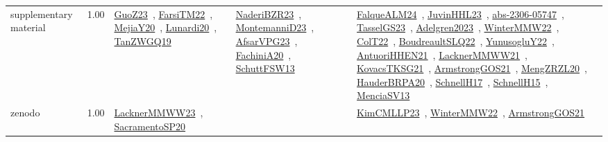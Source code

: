 {\begin{longtable}{p{3cm}r>{\raggedright\arraybackslash}p{6cm}>{\raggedright\arraybackslash}p{6cm}>{\raggedright\arraybackslash}p{8cm}}
\index{supplementary material}\index{Benchmarks!supplementary material}supplementary material &  1.00 & \href{../works/GuoZ23.pdf}{GuoZ23}~\cite{GuoZ23}, \href{../works/FarsiTM22.pdf}{FarsiTM22}~\cite{FarsiTM22}, \href{../works/MejiaY20.pdf}{MejiaY20}~\cite{MejiaY20}, \href{../works/Lunardi20.pdf}{Lunardi20}~\cite{Lunardi20}, \href{../works/TanZWGQ19.pdf}{TanZWGQ19}~\cite{TanZWGQ19} & \href{../works/NaderiBZR23.pdf}{NaderiBZR23}~\cite{NaderiBZR23}, \href{../works/MontemanniD23.pdf}{MontemanniD23}~\cite{MontemanniD23}, \href{../works/AfsarVPG23.pdf}{AfsarVPG23}~\cite{AfsarVPG23}, \href{../works/FachiniA20.pdf}{FachiniA20}~\cite{FachiniA20}, \href{../works/SchuttFSW13.pdf}{SchuttFSW13}~\cite{SchuttFSW13} & \href{../works/FalqueALM24.pdf}{FalqueALM24}~\cite{FalqueALM24}, \href{../works/JuvinHHL23.pdf}{JuvinHHL23}~\cite{JuvinHHL23}, \href{../works/abs-2306-05747.pdf}{abs-2306-05747}~\cite{abs-2306-05747}, \href{../works/TasselGS23.pdf}{TasselGS23}~\cite{TasselGS23}, \href{../works/Adelgren2023.pdf}{Adelgren2023}~\cite{Adelgren2023}, \href{../works/WinterMMW22.pdf}{WinterMMW22}~\cite{WinterMMW22}, \href{../works/ColT22.pdf}{ColT22}~\cite{ColT22}, \href{../works/BoudreaultSLQ22.pdf}{BoudreaultSLQ22}~\cite{BoudreaultSLQ22}, \href{../works/YunusogluY22.pdf}{YunusogluY22}~\cite{YunusogluY22}, \href{../works/AntuoriHHEN21.pdf}{AntuoriHHEN21}~\cite{AntuoriHHEN21}, \href{../works/LacknerMMWW21.pdf}{LacknerMMWW21}~\cite{LacknerMMWW21}, \href{../works/KovacsTKSG21.pdf}{KovacsTKSG21}~\cite{KovacsTKSG21}, \href{../works/ArmstrongGOS21.pdf}{ArmstrongGOS21}~\cite{ArmstrongGOS21}, \href{../works/MengZRZL20.pdf}{MengZRZL20}~\cite{MengZRZL20}, \href{../works/HauderBRPA20.pdf}{HauderBRPA20}~\cite{HauderBRPA20}, \href{../works/SchnellH17.pdf}{SchnellH17}~\cite{SchnellH17}, \href{../works/SchnellH15.pdf}{SchnellH15}~\cite{SchnellH15}, \href{../works/MenciaSV13.pdf}{MenciaSV13}~\cite{MenciaSV13}\\
\index{zenodo}\index{Benchmarks!zenodo}zenodo &  1.00 & \href{../works/LacknerMMWW23.pdf}{LacknerMMWW23}~\cite{LacknerMMWW23}, \href{../works/SacramentoSP20.pdf}{SacramentoSP20}~\cite{SacramentoSP20} &  & \href{../works/KimCMLLP23.pdf}{KimCMLLP23}~\cite{KimCMLLP23}, \href{../works/WinterMMW22.pdf}{WinterMMW22}~\cite{WinterMMW22}, \href{../works/ArmstrongGOS21.pdf}{ArmstrongGOS21}~\cite{ArmstrongGOS21}\\
\end{longtable}
}

\clearpage
